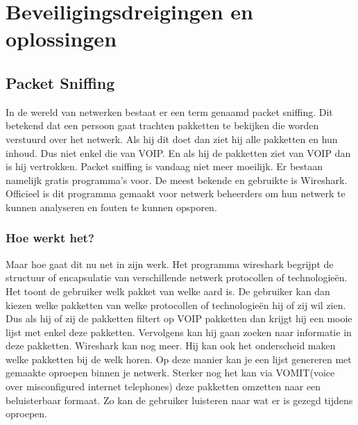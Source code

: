 \documentclass[pdftex,a4paper,12pt,twoside]{report}
\begin{document}

\chapter{Beveiligingsdreigingen en oplossingen}
\label{ch:Beveiligingsdreigingen}

\section{Packet Sniffing}

In de wereld van netwerken bestaat er een term genaamd packet sniffing. Dit betekend dat een persoon gaat trachten pakketten te bekijken die worden verstuurd over het netwerk. Als hij dit doet dan ziet hij alle pakketten en hun inhoud. Dus niet enkel die van VOIP. En als hij de pakketten ziet van VOIP dan is hij vertrokken. Packet sniffing is vandaag niet meer moeilijk. Er bestaan namelijk gratis programma’s voor. De meest bekende en gebruikte is Wireshark. Officieel is dit programma gemaakt voor netwerk beheerders om hun netwerk te kunnen analyseren en fouten te kunnen opsporen.  
\subsection{Hoe werkt het?}
Maar hoe gaat dit nu net in zijn werk. Het programma wireshark begrijpt de structuur of encapsulatie van verschillende netwerk protocollen of technologieën. Het toont de gebruiker welk pakket van welke aard is. De gebruiker kan dan kiezen welke pakketten van welke protocollen of technologieën hij of zij wil zien. Dus als hij of zij de pakketten filtert op VOIP pakketten dan krijgt hij een mooie lijst met enkel deze pakketten. Vervolgens kan hij gaan zoeken naar informatie in deze pakketten. Wireshark kan nog meer. Hij kan ook het onderscheid maken welke pakketten bij de welk horen. Op deze manier kan je een lijst genereren met gemaakte oproepen binnen je netwerk. Sterker nog het kan via VOMIT(voice over misconfigured internet telephones) deze pakketten omzetten naar een beluisterbaar formaat. Zo kan de gebruiker luisteren naar wat er is gezegd tijdens oproepen.

\newpage
\end{document}
